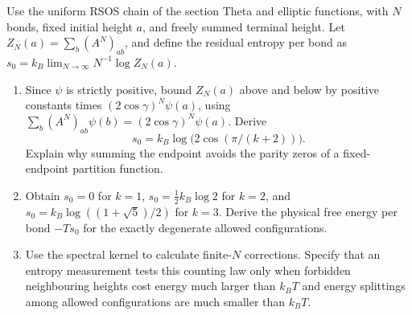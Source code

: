 \begin{exercise}
Use the uniform RSOS chain of the section Theta and elliptic
functions, with $N$ bonds, fixed initial height $a$, and freely
summed terminal height. Let
$Z_N(a)=\sum_b(A^N)_{ab}$, and define the residual entropy
per bond as $s_0=k_B\lim_{N\to\infty}N^{-1}\log Z_N(a)$.
\begin{enumerate}[label=(\alph*)]
\item Since $\psi$ is strictly positive, bound $Z_N(a)$
above and below by positive constants times
$(2\cos\gamma)^N\psi(a)$, using
$\sum_b(A^N)_{ab}\psi(b)=(2\cos\gamma)^N\psi(a)$.
Derive
\[
 s_0=k_B\log\bigl(2\cos(\pi/(k+2))\bigr).
\]
Explain why summing the endpoint avoids the parity zeros
of a fixed-endpoint partition function.
\item Obtain $s_0=0$ for $k=1$, $s_0=\frac12k_B\log2$
for $k=2$, and $s_0=k_B\log((1+\sqrt5)/2)$ for $k=3$.
Derive the physical free energy per bond $-Ts_0$ for
the exactly degenerate allowed configurations.
\item Use the spectral kernel to calculate finite-$N$
corrections. Specify that an entropy measurement tests
this counting law only when forbidden neighbouring heights
cost energy much larger than $k_BT$ and energy splittings
among allowed configurations are much smaller than $k_BT$.
\end{enumerate}
\end{exercise}
